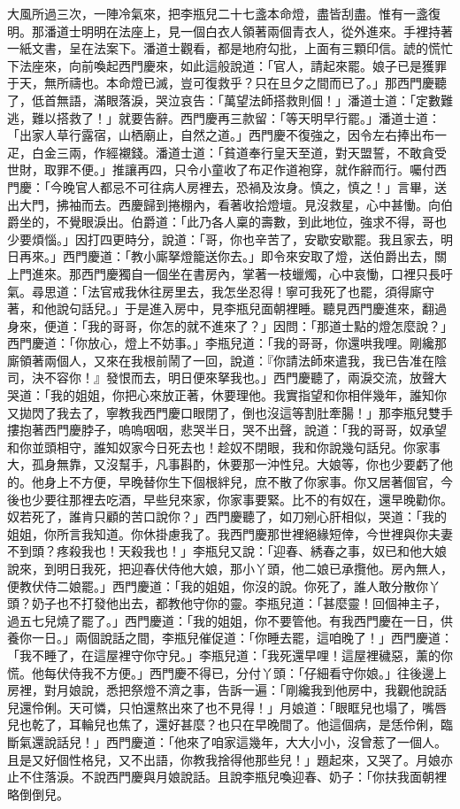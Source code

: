 大風所過三次，一陣冷氣來，把李瓶兒二十七盞本命燈，盡皆刮盡。惟有一盞復明。那潘道士明明在法座上，見一個白衣人領著兩個青衣人，從外進來。手裡持著一紙文書，呈在法案下。潘道士觀看，都是地府勾批，上面有三顆印信。諕的慌忙下法座來，向前喚起西門慶來，如此這般說道：「官人，請起來罷。娘子已是獲罪于天，無所禱也。本命燈已滅，豈可復救乎？只在旦夕之間而已了。」那西門慶聽了，低首無語，滿眼落淚，哭泣哀告：「萬望法師搭救則個！」潘道士道：「定數難逃，難以搭救了！」就要告辭。西門慶再三款留：「等天明早行罷。」潘道士道：「出家人草行露宿，山栖廟止，自然之道。」西門慶不復強之，因令左右捧出布一疋，白金三兩，作經襯錢。潘道士道：「貧道奉行皇天至道，對天盟誓，不敢貪受世財，取罪不便。」推讓再四，只令小童收了布疋作道袍穿，就作辭而行。囑付西門慶：「今晚官人都忌不可往病人房裡去，恐禍及汝身。慎之，慎之！」言畢，送出大門，拂袖而去。西慶歸到捲棚內，看著收拾燈壇。見沒救星，心中甚慟。向伯爵坐的，不覺眼淚出。伯爵道：「此乃各人稟的壽數，到此地位，強求不得，哥也少要煩惱。」因打四更時分，說道：「哥，你也辛苦了，安歇安歇罷。我且家去，明日再來。」西門慶道：「教小廝拏燈籠送你去。」即令來安取了燈，送伯爵出去，關上門進來。那西門慶獨自一個坐在書房內，掌著一枝蠟燭，心中哀慟，口裡只長吁氣。尋思道：「法官戒我休往房里去，我怎坐忍得！寧可我死了也罷，須得廝守著，和他說句話兒。」于是進入房中，見李瓶兒面朝裡睡。聽見西門慶進來，翻過身來，便道：「我的哥哥，你怎的就不進來了？」因問：「那道士點的燈怎麼說？」西門慶道：「你放心，燈上不妨事。」李瓶兒道：「我的哥哥，你還哄我哩。剛纔那廝領著兩個人，又來在我根前鬧了一回，說道：『你請法師來遣我，我已告准在陰司，決不容你！』發恨而去，明日便來拏我也。」西門慶聽了，兩淚交流，放聲大哭道：「我的姐姐，你把心來放正著，休要理他。我實指望和你相伴幾年，誰知你又拋閃了我去了，寧教我西門慶口眼閉了，倒也沒這等割肚牽腸！」那李瓶兒雙手摟抱著西門慶脖子，嗚嗚咽咽，悲哭半日，哭不出聲，說道：「我的哥哥，奴承望和你並頭相守，誰知奴家今日死去也！趁奴不閉眼，我和你說幾句話兒。你家事大，孤身無靠，又沒幫手，凡事斟酌，休要那一沖性兒。大娘等，你也少要虧了他的。他身上不方便，早晚替你生下個根絆兒，庶不散了你家事。你又居著個官，今後也少要往那裡去吃酒，早些兒來家，你家事要緊。比不的有奴在，還早晚勸你。奴若死了，誰肯只顧的苦口說你？」西門慶聽了，如刀剜心肝相似，哭道：「我的姐姐，你所言我知道。你休掛慮我了。我西門慶那世裡絕緣短倖，今世裡與你夫妻不到頭？疼殺我也！天殺我也！」李瓶兒又說：「迎春、綉春之事，奴已和他大娘說來，到明日我死，把迎春伏侍他大娘，那小丫頭，他二娘已承攬他。房內無人，便教伏侍二娘罷。」西門慶道：「我的姐姐，你沒的說。你死了，誰人敢分散你丫頭？奶子也不打發他出去，都教他守你的靈。李瓶兒道：「甚麼靈！回個神主子，過五七兒燒了罷了。」西門慶道：「我的姐姐，你不要管他。有我西門慶在一日，供養你一日。」兩個說話之間，李瓶兒催促道：「你睡去罷，這咱晚了！」西門慶道：「我不睡了，在這屋裡守你守兒。」李瓶兒道：「我死還早哩！這屋裡穢惡，薰的你慌。他每伏侍我不方便。」西門慶不得已，分付丫頭：「仔細看守你娘。」往後邊上房裡，對月娘說，悉把祭燈不濟之事，告訴一遍：「剛纔我到他房中，我觀他說話兒還伶俐。天可憐，只怕還熬出來了也不見得！」月娘道：「眼眶兒也塌了，嘴唇兒也乾了，耳輪兒也焦了，還好甚麼？也只在早晚間了。他這個病，是恁伶俐，臨斷氣還說話兒！」西門慶道：「他來了咱家這幾年，大大小小，沒曾惹了一個人。且是又好個性格兒，又不出語，你教我捨得他那些兒！」題起來，又哭了。月娘亦止不住落淚。不說西門慶與月娘說話。且說李瓶兒喚迎春、奶子：「你扶我面朝裡略倒倒兒。